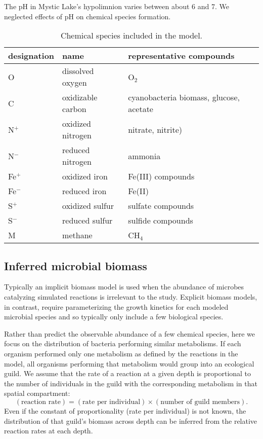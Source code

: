 \documentclass{report}
\begin{document}
The pH in Mystic Lake's hypolimnion varies between about 6 and 7. We neglected effects of pH on chemical species formation.

\begin{table}
\centering
\begin{tabular}{ l l l }
\toprule
designation & name  & representative compounds \\
\midrule
O   & dissolved oxygen    & O$_2$ \\
C   & oxidizable carbon & cyanobacteria biomass, glucose, acetate \\
N$^+$ & oxidized nitrogen &  nitrate, nitrite) \\
N$^-$ & reduced nitrogen  & ammonia \\
Fe$^+$ &  oxidized iron  & Fe(III) compounds  \\
Fe$^-$ &  reduced iron  & Fe(II)  \\
S$^+$ &  oxidized sulfur  & sulfate compounds \\
S$^-$ &  reduced sulfur  & sulfide compounds  \\
M   &   methane &   CH$_4$ \\
\bottomrule
\end{tabular}
\caption{Chemical species included in the model.}
\label{tab:chemical_species}
\end{table}

\subsection{Inferred microbial biomass}
Typically an implicit biomass model is used when the abundance of microbes catalyzing
simulated reactions is irrelevant to the study. Explicit biomass models, in contrast, require parameterizing the growth kinetics for each modeled microbial species and so typically only include a few biological species. 

Rather than predict the observable abundance of a few chemical species, here we focus on the
distribution of bacteria performing similar metabolisms. If each organism performed only
one metabolism as defined by the reactions in the model, all organisms performing that
metabolism would group into an ecological guild. We assume that the
rate of a reaction at a given depth is proportional to the number of individuals in the guild with the
corresponding metabolism in that spatial compartment:
\begin{equation}
  (\text{reaction rate}) = (\text{rate per individual}) \times (\text{number of guild members}).
\end{equation}
Even if the constant of proportionality (rate per individual) is not known, the distribution of
that guild's biomass across
depth can be inferred from the relative reaction rates at each depth.
\end{document}
